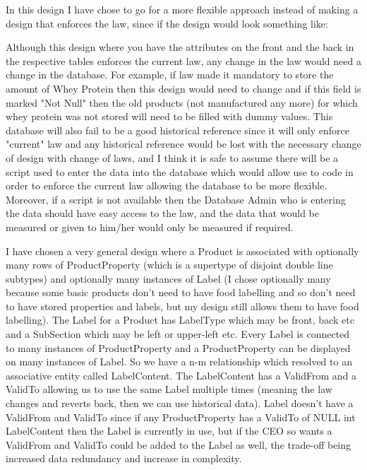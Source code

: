 In this design I have chose to go for a more flexible approach instead of making a design that enforces the law, since if the design would look something like: 

\begin{figure}[!htb]
\centering
\end{figure}

Although this design where you have the attributes on the front and the back in the respective tables enforces the current law, any change in the law would need a change in the database. For example, if law made it mandatory to store the amount of Whey Protein then this design would need to change and if this field is marked "Not Null" then the old products (not manufactured any more) for which whey protein was not stored will need to be filled with dummy values. This database will also fail to be a good historical reference since it will only enforce "current" law and any historical reference would be lost with the necessary change of design with change of laws, and I think it is safe to assume there will be a script used to enter the data into the database which would allow use to code in order to enforce the current law allowing the database to be more flexible. Moreover, if a script is not available then the Database Admin who is entering the data should have easy access to the law, and the data that would be measured or given to him/her would only be measured if required. 

I have chosen a very general design where a Product is associated with optionally many rows of ProductProperty (which is a supertype of disjoint double line subtypes) and optionally many instances of Label (I chose optionally many because some basic products don't need to have food labelling and so don't need to have stored properties and labels, but my design still allows them to have food labelling). The Label for a Product has LabelType which may be front, back etc and a SubSection which may be left or upper-left etc. Every Label is connected to many instances of ProductProperty and a ProductProperty can be displayed on many instances of Label. So we have a n-m relationship which resolved to an associative entity called LabelContent. The LabelContent has a ValidFrom and a ValidTo allowing us to use the same Label multiple times (meaning the law changes and reverts back, then we can use historical data). Label doesn't have a ValidFrom and ValidTo since if any ProductProperty has a ValidTo of NULL int LabelContent then the Label is currently in use, but if the CEO so wants a ValidFrom and ValidTo could be added to the Label as well, the trade-off being increased data redundancy and increase in complexity. 

